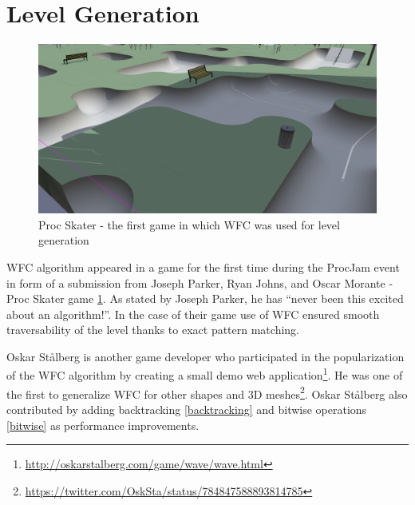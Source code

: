 \documentclass[shortabstract, english, inz]{iithesis}
\begin{document}
\section{Level Generation}
\begin{figure}[H]
\centering
\includegraphics[width=1\textwidth, angle=0]{images/skater.png}
\caption{Proc Skater - the first game in which WFC was used for level generation \cite{skater}}
\label{fig:skater}
\end{figure}
WFC algorithm appeared in a game for the first time during the ProcJam event in form of a submission from Joseph Parker, Ryan Johns, and Oscar Morante - Proc Skater game \ref{fig:skater}. As stated by Joseph Parker, he has “never been this excited about an algorithm!”. In the case of their game use of WFC ensured smooth traversability of the level thanks to exact pattern matching.

 Oskar Stålberg is another game developer who participated in the popularization of the WFC algorithm by creating a small demo web application\footnote{\url{http://oskarstalberg.com/game/wave/wave.html}}. He was one of the first to generalize WFC for other shapes and 3D meshes\footnote{\url{https://twitter.com/OskSta/status/784847588893814785}}. Oskar Stålberg also contributed by adding backtracking \ref{backtracking} and bitwise operations \ref{bitwise} as performance improvements. \cite{Smith}
\end{document}
